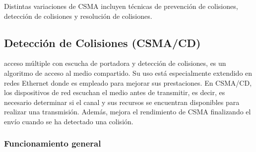 \documentclass[a4paper]{article}
\begin{document}
	Distintas variaciones de CSMA incluyen técnicas de prevención de colisiones, detección de colisiones y resolución de colisiones.
	
	\noindent{}
	
	\subsection{Detección de Colisiones (CSMA/CD)}
	acceso múltiple con escucha de portadora y detección de colisiones, es un algoritmo de acceso al medio compartido. Su uso está especialmente extendido en redes Ethernet donde es empleado para mejorar sus prestaciones. En CSMA/CD, los dispositivos de red escuchan el medio antes de transmitir, es decir, es necesario determinar si el canal y sus recursos se encuentran disponibles para realizar una transmisión. Además, mejora el rendimiento de CSMA finalizando el envío cuando se ha detectado una colisión. 
	
	\subsubsection{Funcionamiento general}
	
\end{document}
